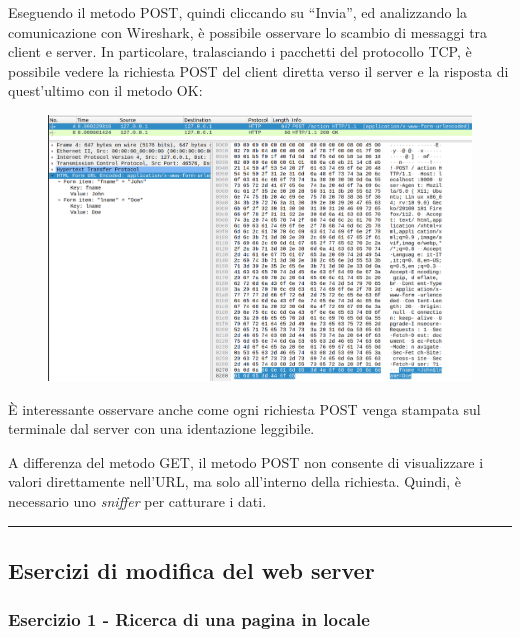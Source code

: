 \documentclass[a4paper]{article}
\newcommand{\longline}{\noindent\rule{\textwidth}{0.4pt}}
\newcommand{\dquotes}[1]{``#1''}
\begin{document}
	\noindent
	Eseguendo il metodo POST, quindi cliccando su \dquotes{Invia}, ed analizzando la comunicazione con Wireshark, è possibile osservare lo scambio di messaggi tra client e server. In particolare, tralasciando i pacchetti del protocollo TCP, è possibile vedere la richiesta POST del client diretta verso il server e la risposta di quest'ultimo con il metodo OK:
	\begin{figure}[!htp]
		\centering
		\includegraphics[width=\textwidth]{img/web-server/web-server-3.png}
	\end{figure}
	
	\noindent
	È interessante osservare anche come ogni richiesta POST venga stampata sul terminale dal server con una identazione leggibile.\newline
	
	\noindent
	A differenza del metodo GET, il metodo POST non consente di visualizzare i valori direttamente nell'URL, ma solo all'interno della richiesta. Quindi, è necessario uno \emph{sniffer} per catturare i dati.
	
	\longline
	
	\subsection[\textcolor{Red3}{\textbf{Esercizi}} di modifica del web server]{Esercizi di modifica del web server}
	
	\subsubsection{Esercizio 1 - Ricerca di una pagina in locale}
	
\end{document}
